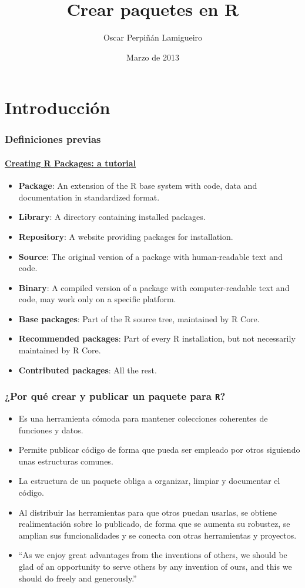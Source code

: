 \documentclass[xcolor={usenames,svgnames,dvipsnames}]{beamer}
\title{Crear paquetes en R}
\author{Oscar Perpiñán Lamigueiro}
\date{Marzo de 2013}
\begin{document}
\maketitle


\section{Introducción}
\label{sec-1}
\begin{frame}
\frametitle{Definiciones previas}
\framesubtitle{\href{http://cran.r-project.org/doc/contrib/Leisch-CreatingPackages.pdf}{Creating R Packages: a tutorial}}
\label{sec-1-1}

\begin{itemize}
\item \textbf{Package}: An extension of the R base system with code, data and
  documentation in standardized format.
\item \textbf{Library}: A directory containing installed packages.
\item \textbf{Repository}: A website providing packages for installation.
\item \textbf{Source}: The original version of a package with human-readable text and code.
\item \textbf{Binary}: A compiled version of a package with computer-readable
  text and code, may work only on a specific platform.
\item \textbf{Base packages}: Part of the R source tree, maintained by R Core.
\item \textbf{Recommended packages}: Part of every R installation, but not
  necessarily maintained by R Core.
\item \textbf{Contributed packages}: All the rest.
\end{itemize}
\end{frame}
\begin{frame}
\frametitle{¿Por qué crear y publicar un paquete para \texttt{R}?}
\label{sec-1-2}


\begin{itemize}
\item Es una herramienta cómoda para mantener colecciones coherentes de funciones
  y datos.
\item Permite publicar código de forma que pueda ser empleado por
  otros siguiendo unas estructuras comunes.
\item La estructura de un paquete obliga a organizar, limpiar y
  documentar el código.
\item Al distribuir las herramientas para que otros puedan usarlas, se
  obtiene realimentación sobre lo publicado, de forma que se
  aumenta su robustez, se amplian sus funcionalidades y se conecta
  con otras herramientas y proyectos.
\item ``As we enjoy great advantages from the inventions of others, we
  should be glad of an opportunity to serve others by any
  invention of ours, and this we should do freely and generously.''
\end{itemize}
\end{frame}
\end{document}
